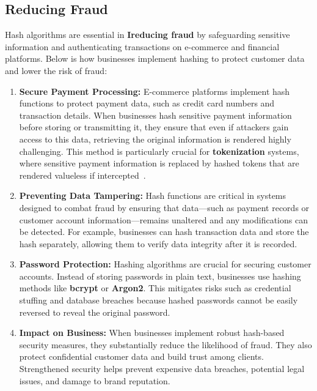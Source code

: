 \documentclass[11pt,a4paper]{article}
\begin{document}
    \subsection*{Reducing Fraud}
    Hash algorithms are essential in \textbf{Ireducing fraud} by safeguarding sensitive information and authenticating transactions on e-commerce and financial platforms. Below is how businesses implement hashing to protect customer data and lower the risk of fraud:

    \begin{enumerate}
        \item \textbf{Secure Payment Processing:}
        \newline
        E-commerce platforms implement hash functions to protect payment data, such as credit card numbers and transaction details. When businesses hash sensitive payment information before storing or transmitting it, they ensure that even if attackers gain access to this data, retrieving the original information is rendered highly challenging. This method is particularly crucial for \textbf{tokenization} systems, where sensitive payment information is replaced by hashed tokens that are rendered valueless if intercepted~\cite{tokenization}.

        \item \textbf{Preventing Data Tampering:}
        \newline
        Hash functions are critical in systems designed to combat fraud by ensuring that data—such as payment records or customer account information—remains unaltered and any modifications can be detected. For example, businesses can hash transaction data and store the hash separately, allowing them to verify data integrity after it is recorded.

        \item \textbf{Password Protection:}
        \newline
        Hashing algorithms are crucial for securing customer accounts. Instead of storing passwords in plain text, businesses use hashing methods like \textbf{bcrypt} or \textbf{Argon2}. This mitigates risks such as credential stuffing and database breaches because hashed passwords cannot be easily reversed to reveal the original password.

        \item \textbf{Impact on Business:}
        \newline
        When businesses implement robust hash-based security measures, they substantially reduce the likelihood of fraud. They also protect confidential customer data and build trust among clients. Strengthened security helps prevent expensive data breaches, potential legal issues, and damage to brand reputation.

    \end{enumerate}
\end{document}

